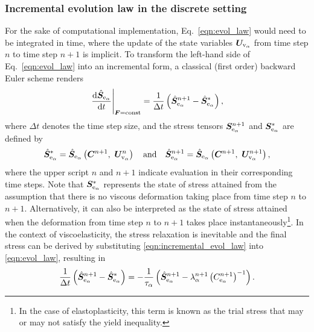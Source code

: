 \subsubsection{Incremental evolution law in the discrete setting}
\label{sec:incremental_evolution_law}

For the sake of computational implementation, Eq.~\eqref{eqn:evol_law} would need to be integrated in time, where the update of the state variables $\U_{\mathrm{v}_\alpha}$ from time step $n$ to time step $n+1$ is implicit. To transform the left-hand side of Eq.~\eqref{eqn:evol_law} into an incremental form, a classical (first order) backward Euler scheme renders
%
\begin{equation}
	\label{eqn:incremental_evol_law}
	\left.\frac{\mathrm{d}\hat\S_{\mathrm{e}_{\alpha}} }{\mathrm{d}t} \right|_{\F=\text{const}} =
    \frac{1}{\Delta t} \left(
      \hat\S_{\mathrm{e}_{\alpha}}^{n+1} - \hat\S_{\mathrm{e}_{\alpha}}^{*}
    \right),
\end{equation}
%
where $\Delta t$ denotes the time step size, and the stress tensors $\S_{\mathrm{e}_{\alpha}}^{n+1}$ and $\S_{\mathrm{e}_{\alpha}}^{*}$ are defined by
%
\begin{equation}
	\label{eqn:intermediate_S}
	\hat\S_{\mathrm{e}_{\alpha}}^{*} = \hat\S_{\mathrm{e}_{\alpha}} \left(\C^{n+1},~\U_{\mathrm{v}_{\alpha}}^n \right)
  \quad \text{and} \quad
  \hat\S_{\mathrm{e}_{\alpha}}^{n+1} = \hat\S_{\mathrm{e}_{\alpha}} \left(\C^{n+1},~\U_{\mathrm{v}_{\alpha}}^{n+1} \right),
\end{equation}
%
where the upper script $n$ and $n+1$ indicate evaluation in their corresponding time steps. Note that $\S_{\mathrm{e}_{\alpha}}^{*}$ represents the state of stress attained from the assumption that there is no viscous deformation taking place from time step $n$ to $n+1$. Alternatively, it can also be interpreted as the state of stress attained when the deformation from time step $n$ to $n+1$ takes place instantaneously\footnote{In the case of elastoplasticity, this term is known as the trial stress that may or may not satisfy the yield inequality.}. In the context of viscoelasticity, the stress relaxation is inevitable and the final stress can be derived by substituting \eqref{eqn:incremental_evol_law} into \eqref{eqn:evol_law}, resulting in
%
\begin{equation}
	\label{eqn:backward_euler_S}
	\frac{1}{\Delta t} \left( \hat\S_{\mathrm{e}_{\alpha}}^{n+1} -  \hat\S_{\mathrm{e}_{\alpha}}^{*} \right) =
  - \frac{1}{\tau_\alpha} \left(
    \hat\S_{\mathrm{e}_{\alpha}}^{n+1} - \lambda_\alpha^{n+1} \left(C_{\mathrm{e}_{\alpha}}^{n+1}\right)^{-1}
  \right) .
\end{equation}
